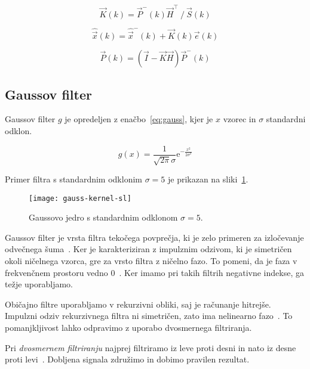 \begin{equation}
\vec{K}(k) = {\vec{P}^-(k) \vec{H}^\top} ~/~ {\vec{S}(k)}
\label{eq:ojacanje}
\end{equation}

\begin{equation}
\hat{\vec{x}}(k) = \hat{\vec{x}}^-(k) + \vec{K}(k) \vec{e}(k)
\label{eq:aposteriori-stanje}
\end{equation}

\begin{equation}
\vec{P}(k) = \left( \vec{I} - \vec{K} \vec{H} \right) \vec{P}^-(k)
\label{eq:aposteriori-p}
\end{equation}








\subsection{Gaussov filter}\label{sec:gaussov-filter}
Gaussov filter $g$ je opredeljen z enačbo~\eqref{eq:gauss}, kjer je $x$ vzorec in $\sigma$ standardni odklon. 


\begin{equation}
g(x) = \frac{1}{\sqrt{2 \pi} \sigma} \mathrm{e}^{-\frac{x^2}{2 \sigma^2}} 
\label{eq:gauss}
\end{equation}


Primer filtra s standardnim odklonim $\sigma = 5$ je prikazan na sliki~\ref{fig:gauss}.

\begin{figure}[!htb]
\centering
\texttt{[image: gauss-kernel-sl]}
\caption[Gaussovo jedro s standardnim odklonom $\sigma=5$]{Gaussovo jedro s standardnim odklonom $\sigma=5$. }
\label{fig:gauss}
\end{figure}


Gaussov filter je vrsta filtra tekočega povprečja, ki je zelo primeren za izločevanje odvečnega šuma~\cite{smith1997scientist}. Ker je karakteriziran z impulznim odzivom, ki je simetričen okoli ničelnega vzorca, gre za vrsto filtra z ničelno fazo. To pomeni, da je faza v frekvenčnem prostoru vedno $0$~\cite{smith1997scientist}. Ker imamo pri takih filtrih negativne indekse, ga težje uporabljamo. 

Običajno filtre uporabljamo v rekurzivni obliki, saj je računanje hitrejše. Impulzni odziv rekurzivnega filtra ni simetričen, zato ima nelinearno fazo~\cite{smith1997scientist}. To pomanjkljivost lahko odpravimo z uporabo dvosmernega filtriranja.

Pri \emph{dvosmernem filtriranju} najprej filtriramo iz leve proti desni in nato iz desne proti levi~\cite{smith1997scientist}. Dobljena signala združimo in dobimo pravilen rezultat.


